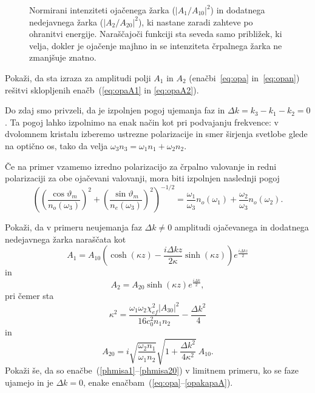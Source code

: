 \begin{figure}[h]
\centering
\def\svgwidth{90truemm} 

\caption{Normirani intenziteti ojačenega žarka ($|A_1/A_{10}|^2$) in dodatnega 
nedejavnega žarka ($|A_2/A_{20}|^2$), ki nastane zaradi zahteve po ohranitvi energije. 
Naraščajoči funkciji sta seveda samo približek, ki velja, dokler je ojačenje majhno in 
se intenziteta črpalnega žarka ne zmanjšuje znatno.}
\label{fig:opagraf}
\end{figure}

\begin{definition}
Pokaži, da sta izraza za amplitudi polji $A_1$ in $A_2$ (enačbi~\ref{eq:opa} in~\ref{eq:opan})
rešitvi sklopljenih enačb~(\ref{eq:opaA1} in \ref{eq:opaA2}).
\end{definition}

Do zdaj smo privzeli, da je izpolnjen pogoj ujemanja faz 
in $\Delta k=k_{3}-k_{1}-k_{2}=0$. 
Ta pogoj lahko izpolnimo na enak način kot pri podvajanju frekvence: v dvolomnem kristalu 
izberemo ustrezne polarizacije in smer širjenja svetlobe glede na optično os, 
tako da velja $\omega_{3}n_{3}=\omega_{1}n_{1}+\omega_{2}n_{2}$.

Če na primer vzamemo izredno polarizacijo za črpalno valovanje
in redni polarizaciji za obe ojačevani valovanji, mora biti izpolnjen naslednji pogoj 
\begin{equation}
\left(\left(\frac{\cos\vartheta_{m}}{n_{o}(\omega_3)}\right)^{2}
+\left(\frac{\sin\vartheta_{m}}{n_{e}(\omega_3)}\right)^{2}\right)^{-1/2}=
\frac{\omega_{1}}{\omega_{3}}n_{o}(\omega_1)+\frac{\omega_{2}}{\omega_{3}}n_{o}(\omega_2).
\label{8.34}
\end{equation}

\begin{definition}
Pokaži, da v primeru neujemanja faz $\Delta k \neq 0$ amplitudi ojačevanega in dodatnega 
nedejavnega žarka naraščata kot 
\begin{equation}
A_1 = A_{10} \left( \cosh(\kappa z) - \frac{i \Delta kz}{2 \kappa} \sinh (\kappa z) 
\right) e^{\frac{i \Delta kz}{2}}
\label{phmisa1}
\end{equation}
in
\begin{equation}
A_2 = A_{20} \sinh(\kappa z) e^{\frac{i \Delta k}{2}},
\end{equation}
pri čemer sta
\begin{equation}
\kappa^2 = \frac{\omega_1 \omega_2 \chi_{ef}^2|A_{30}|^2}
{16 c_0^2 n_1 n_2} - \frac{\Delta k^2}{4}
\end{equation}
in
\begin{equation}
A_{20} = i \sqrt{\frac{\omega_2 n_1}{\omega_1 n_2}} \sqrt{1 + \frac{\Delta k^2}{4 \kappa^2}}
~A_{10}.
\label{phmisa20}
\end{equation}
Pokaži še, da so enačbe~(\ref{phmisa1}--\ref{phmisa20}) v limitnem primeru, 
ko se faze ujamejo in je $\Delta k = 0$,
enake enačbam~(\ref{eq:opa}--\ref{opakapaA}).
\end{definition}

